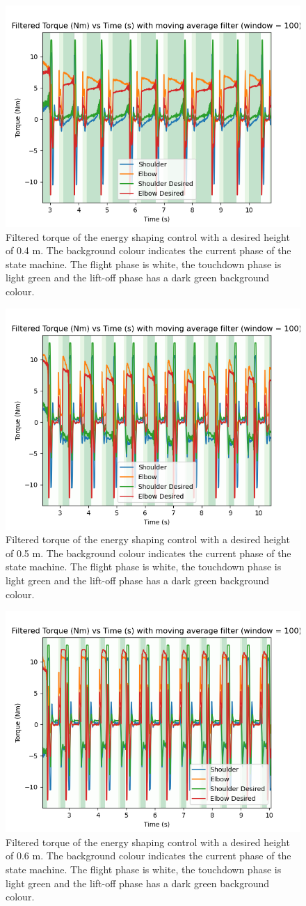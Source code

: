\documentclass[onecolumn, letter paper]{report}
\begin{document}
\begin{figure}[htb!]
    \centering
    \includegraphics[width=.6\textwidth]{figures/0.4m/filtered_torque.png}
    \caption{Filtered torque of the energy shaping control with a desired height of 0.4 m. The background colour indicates the current phase of the state machine. The flight phase is white, the touchdown phase is light green and the lift-off phase has a dark green background colour. }
    \label{fig:4torque}
\end{figure}
\begin{figure}[htb!]
    \centering
    \includegraphics[width=.6\textwidth]{figures/0.5m/filtered_torque.png}
    \caption{Filtered torque of the energy shaping control with a desired height of 0.5 m. The background colour indicates the current phase of the state machine. The flight phase is white, the touchdown phase is light green and the lift-off phase has a dark green background colour.}
    \label{fig:5torque}
\end{figure}
\begin{figure}[htb!]
    \centering
    \includegraphics[width=.6\textwidth]{figures/0.6m/filtered_torque.png}
    \caption{Filtered torque of the energy shaping control with a desired height of 0.6 m. The background colour indicates the current phase of the state machine. The flight phase is white, the touchdown phase is light green and the lift-off phase has a dark green background colour.}
    \label{fig:6torque}
\end{figure}
\end{document}
